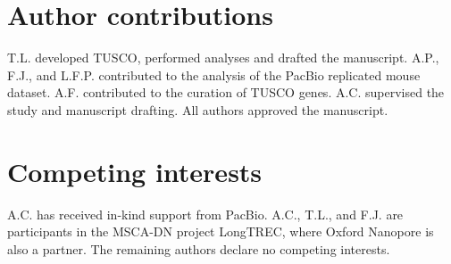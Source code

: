 \documentclass[pdflatex,sn-nature]{sn-jnl}%
\begin{document}
\section{Author contributions}

T.L. developed TUSCO, performed analyses and drafted the manuscript. A.P., F.J., and L.F.P. contributed to the analysis of the PacBio replicated mouse dataset. A.F. contributed to the curation of TUSCO genes. A.C. supervised the study and manuscript drafting. All authors approved the manuscript.

\section{Competing interests}

A.C. has received in-kind support from PacBio. A.C., T.L., and F.J. are participants in the MSCA-DN project LongTREC, where Oxford Nanopore is also a partner. The remaining authors declare no competing interests.




\clearpage
\processdelayedfloats
\end{document}

